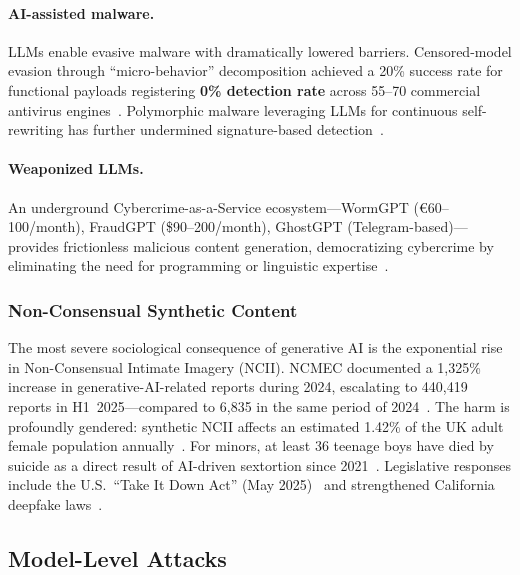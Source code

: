 \paragraph{AI-assisted malware.}
LLMs enable evasive malware with dramatically lowered barriers. Censored-model evasion through ``micro-behavior'' decomposition achieved a 20\% success rate for functional payloads registering \textbf{0\% detection rate} across 55--70 commercial antivirus engines~\cite{mdpi2025malware}. Polymorphic malware leveraging LLMs for continuous self-rewriting has further undermined signature-based detection~\cite{crowdstrike2025ransomware}.

\paragraph{Weaponized LLMs.}
An underground Cybercrime-as-a-Service ecosystem---WormGPT (\euro60--100/month), FraudGPT (\$90--200/month), GhostGPT (Telegram-based)---provides frictionless malicious content generation, democratizing cybercrime by eliminating the need for programming or linguistic expertise~\cite{levelblue2023wormgpt,elpaccto2026}.


\subsubsection{Non-Consensual Synthetic Content}
\label{sec:threat-ncii}

The most severe sociological consequence of generative AI is the exponential rise in Non-Consensual Intimate Imagery (NCII). NCMEC documented a 1,325\% increase in generative-AI-related reports during 2024, escalating to 440,419 reports in H1~2025---compared to 6,835 in the same period of 2024~\cite{ncmec2025}. The harm is profoundly gendered: synthetic NCII affects an estimated 1.42\% of the UK adult female population annually~\cite{swgfl2025}. For minors, at least 36 teenage boys have died by suicide as a direct result of AI-driven sextortion since 2021~\cite{ncmec2025}. Legislative responses include the U.S.\ ``Take It Down Act'' (May 2025)~\cite{takeitdown2025} and strengthened California deepfake laws~\cite{calmatters2026deepfake}.


\subsection{Model-Level Attacks}
\label{sec:threat-model}

